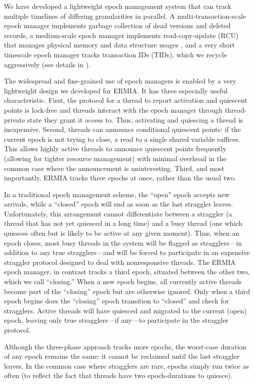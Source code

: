 We have developed a lightweight epoch management system that can track multiple timelines of differing granularities in parallel. A multi-transaction-scale epoch manager implements garbage collection of dead versions and deleted records, a medium-scale epoch manager implements read-copy-update (RCU) that manages physical memory and data structure usages \cite{McKenneyS98}, and a very short timescale epoch manager tracks transaction IDs (TIDs), which we recycle aggressively (see details in ).

The widespread and fine-grained use of epoch managers is enabled by a very lightweight design we developed for ERMIA. It has three especially useful characteristic. First, the protocol for a thread to report activation and quiescent points is lock-free and threads interact with the epoch manager through thread-private state they grant it access to. Thus, activating and quiescing a thread is inexpensive. Second, threads can announce conditional quiescent points: if the current epoch is not trying to close, a read to a single shared variable suffices. This allows highly active threads to announce quiescent points frequently (allowing for tighter resource management) with minimal overhead in the common case where the announcement is uninteresting. Third, and most importantly, ERMIA tracks three epochs at once, rather than the usual two.

In a traditional epoch management scheme, the ``open'' epoch accepts new arrivals, while a ``closed'' epoch will end as soon as the last straggler leaves. Unfortunately, this arrangement cannot differentiate between a straggler (a thread that has not yet quiesced in a long time) and a busy thread (one which quiesces often but is likely to be active at any given moment). Thus, when an epoch closes, most busy threads in the system will be flagged as stragglers---in addition to any true stragglers---and will be forced to participate in an expensive straggler protocol designed to deal with nonresponsive threads. The ERMIA epoch manager, in contrast tracks a third epoch, situated between the other two, which we call ``closing.'' When a new epoch begins, all currently active threads become part of the ``closing'' epoch but are otherwise ignored. Only when a third epoch begins does the ``closing'' epoch transition to ``closed'' and check for stragglers. Active threads will have quiesced and migrated to the current (open) epoch, leaving only true stragglers---if any---to participate in the straggler protocol.

Although the three-phase approach tracks more epochs, the worst-case duration of any epoch remains the same: it cannot be reclaimed until the last straggler leaves. In the common case where stragglers are rare, epochs simply run twice as often (to reflect the fact that threads have two epoch-durations to quiesce). 

